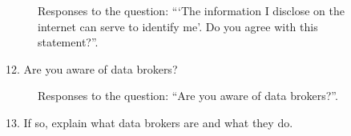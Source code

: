\begin{figure}[H]
    \begin{center}
        \caption*{Responses to the question: ```The information I disclose on the internet can serve to identify me'. Do you agree with this statement?''.}
        \label{fig:survey_s5_q11}
    \end{center}
\end{figure}

\vspace{2cm}

12. Are you aware of data brokers?\\

\begin{figure}[H]
    \centering
    \caption*{Responses to the question: ``Are you aware of data brokers?''.}
    \label{fig:survey_s5_q12}
\end{figure}

\clearpage

13. If so, explain what data brokers are and what they do.


